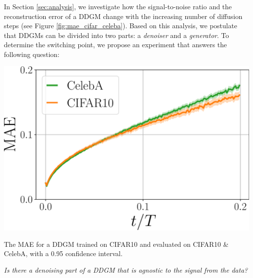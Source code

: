 In Section \ref{sec:analysis}, we investigate how the signal-to-noise ratio and the reconstruction error of a DDGM change with the increasing number of diffusion steps (see Figure \ref{fig:mae_cifar_celeba}). Based on this analysis, we postulate that DDGMs can be divided into two parts: a \emph{denoiser} and a \emph{generator}. To determine the switching point, we propose an experiment that answers the following question:
\begin{marginfigure}
	\includegraphics[width=\linewidth]{pics/4_daed/experiments/MAE_step_cifar_celeba.pdf}
	\caption{The MAE for a DDGM trained on CIFAR10 and evaluated on CIFAR10 \& CelebA, with a 0.95 confidence interval.}
	\label{fig:mae_cifar_celeba}
\end{marginfigure}
\textit{Is there a denoising part of a DDGM that is agnostic to the signal from the data?}

